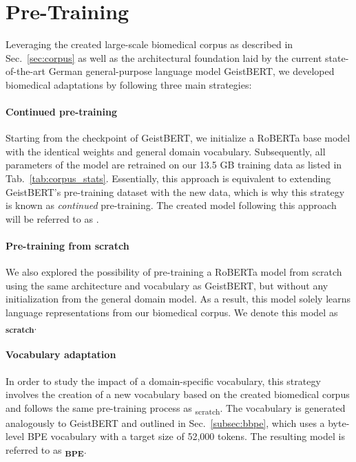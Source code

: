 \section{Pre-Training} \label{sec:pre-training}

Leveraging the created large-scale biomedical corpus as described in
Sec.~\ref{sec:corpus} as well as the architectural foundation laid by the
current state-of-the-art German general-purpose language model GeistBERT, we
developed biomedical adaptations by following three main strategies:

\paragraph{Continued pre-training} 
Starting from the checkpoint of GeistBERT, we initialize a RoBERTa base model
with the identical weights and general domain vocabulary. Subsequently, all
parameters of the model are retrained on our 13.5 GB training data as listed in
Tab.~\ref{tab:corpus_stats}. Essentially, this approach is equivalent to
extending GeistBERT's pre-training dataset with the new data, which is why this
strategy is known as \textit{continued} pre-training. The created model
following this approach will be referred to as \textbf{\ChristBERT}. 

\paragraph{Pre-training from scratch}
We also explored the possibility of pre-training a RoBERTa model from scratch
using the same architecture and vocabulary as GeistBERT, but without any
initialization from the general domain model. As a result, this model solely
learns language representations from our biomedical corpus. We denote this model
as \textbf{\ChristBERT\textsubscript{scratch}}.

\paragraph{Vocabulary adaptation}
In order to study the impact of a domain-specific vocabulary, this strategy
involves the creation of a new vocabulary based on the created biomedical corpus
and follows the same pre-training process as \ChristBERT\textsubscript{scratch}.
The vocabulary is generated analogously to GeistBERT and outlined in
Sec.~\ref{subsec:bbpe}, which uses a byte-level BPE vocabulary with a target
size of 52,000 tokens. The resulting model is referred to as
\textbf{\ChristBERT\textsubscript{BPE}}. \\


